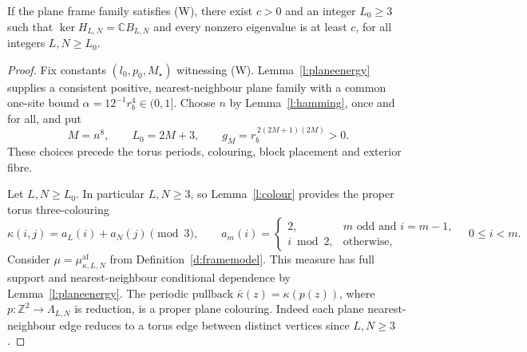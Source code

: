 \begin{theorem}\label{t:mainW}
If the plane frame family satisfies (W), there exist \(c>0\) and
an integer \(L_0\ge3\) such that
\(\ker H_{L,N}=\mathbb C B_{L,N}\) and every nonzero eigenvalue is
at least \(c\), for all integers \(L,N\ge L_0\).
\end{theorem}

\begin{proof}
Fix constants \((l_0,p_0,M_\star)\) witnessing (W).
Lemma~\ref{l:planeenergy} supplies a consistent positive,
nearest-neighbour plane family with a common one-site bound
\(\alpha=12^{-1}r_b^4\in(0,1]\).  Choose \(n\) by
Lemma~\ref{l:hamming}, once and for all, and put
\[
 M=n^8,\qquad L_0=2M+3,\qquad
 g_M=r_b^{\,2(2M+1)(2M)}>0.
\]
These choices precede the torus periods, colouring, block placement
and exterior fibre.

Let \(L,N\ge L_0\).  In particular \(L,N\ge3\), so
Lemma~\ref{l:colour} provides the proper torus three-colouring
\[
 \kappa(i,j)=a_L(i)+a_N(j)\pmod3,\qquad
 a_m(i)=\begin{cases}
 2,&m\text{ odd and }i=m-1,\\
 i\bmod2,&\text{otherwise},
 \end{cases}
 \quad 0\le i<m.
\]
Consider
\(\mu=\mu^{\mathrm{af}}_{\kappa,L,N}\) from
Definition~\ref{d:framemodel}.  This measure has full support and
nearest-neighbour conditional dependence by
Lemma~\ref{l:planeenergy}.  The periodic pullback
\(\bar\kappa(z)=\kappa(p(z))\), where
\(p:\mathbb Z^2\to\Lambda_{L,N}\) is reduction, is a proper plane
colouring.  Indeed each plane nearest-neighbour edge reduces to a
torus edge between distinct vertices since \(L,N\ge3\).


\end{proof}
